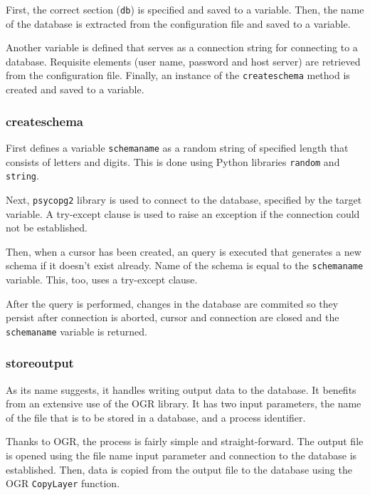 First, the correct section (\texttt{db}) is specified and saved to a variable. Then, the name of the database is extracted from the configuration file and saved to a variable. 

Another variable is defined that serves as a connection string for connecting to a database. Requisite elements (user name, password and host server) are retrieved from the configuration file. Finally, an instance of the \texttt{\textunderscore create\textunderscore schema} method is created and saved to a variable.


\subsubsection{\textunderscore create\textunderscore schema} 
First defines a variable \texttt{schema\textunderscore name} as a random string of specified length that consists of letters and digits. This is done using Python libraries \texttt{random} and \texttt{string}.  
 

Next, \texttt{psycopg2} library is used to connect to the database, specified by the target variable. A try-except clause is used to raise an exception if the connection could not be established. 

Then, when a cursor has been created, an  query is executed that generates a new schema if it doesn't exist already. Name of the schema is equal to the \texttt{schema\textunderscore name} variable. This, too, uses a try-except clause.

After the  query is performed, changes in the database are commited so they persist after connection is aborted, cursor and connection are closed and the \texttt{schema\textunderscore name} variable is returned.

\subsubsection{\textunderscore store\textunderscore output} 
As its name suggests, it handles writing output data to the database. It benefits from an extensive use of the OGR library. It has two input parameters, the name of the file that is to be stored in a database, and a process identifier. 

Thanks to OGR, the process is fairly simple and straight-forward. The output file is opened using the file name input parameter and connection to the database is established. Then, data is copied from the output file to the database using the OGR \texttt{CopyLayer} function. 


